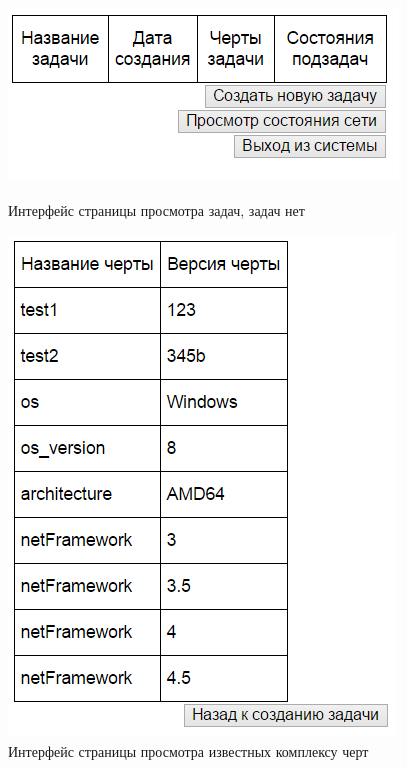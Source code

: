 \documentclass[a4paper,12pt]{report}
\numberwithin{equation}{section}
\begin{document}
  \begin{figure}
    \centering
    \begin{minipage}{.49\linewidth}
      \centering
      \includegraphics[width=\linewidth]{img/interface/tasks-empty}
      \caption{Интерфейс страницы просмотра задач, задач нет}
      \label{fig:interface-tasks-empty}
    \end{minipage}
    \hfill
    \begin{minipage}{.49\linewidth}
      \centering
      \includegraphics[width=\linewidth]{img/interface/traits}
      \caption{Интерфейс страницы просмотра известных комплексу черт}
      \label{fig:interface-traits}
    \end{minipage}  
  \end{figure}
  
\end{document}
